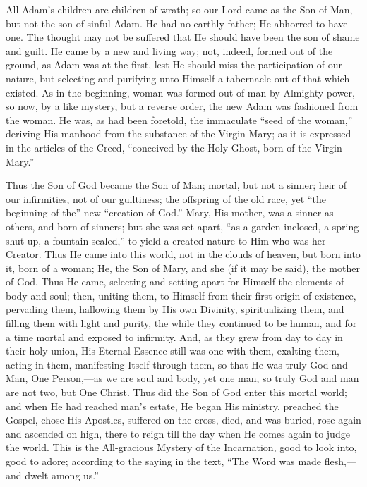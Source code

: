 All Adam's children are children of wrath; so our Lord came as the
Son of Man, but not the son of sinful Adam. He had no earthly father;
He abhorred to have one. The thought may not be suffered that He
should have been the son of shame and guilt. He came by a new and
living way; not, indeed, formed out of the ground, as Adam was at the
first, lest He should miss the participation of our nature, but
selecting and purifying unto Himself a tabernacle out of that which
existed. As in the beginning, woman was formed out of man by Almighty
power, so now, by a like mystery, but a reverse order, the new Adam
was fashioned from the woman. He was, as had been foretold, the
immaculate ``seed of the woman,'' deriving His manhood from
the substance of the Virgin Mary; as it is expressed in the articles
of the Creed, ``conceived by the Holy Ghost, born of the Virgin
Mary.''

Thus the Son of God became the Son of Man; mortal, but not a
sinner; heir of our infirmities, not of our guiltiness; the offspring
of the old race, yet ``the beginning of the'' new
``creation of God.'' Mary, His mother, was a sinner as others,
and born of sinners; but she was set apart, ``as a garden inclosed,
a spring shut up, a fountain sealed,'' to yield a created nature
to Him who was her Creator. Thus He came into this world, not in the
clouds of heaven, but born into it, born of a woman; He, the Son of
Mary, and she (if it may be said), the mother of God. Thus He came,
selecting and setting apart for Himself the elements of body and soul;
then, uniting them, to Himself from their first origin of existence,
pervading them, hallowing them by His own Divinity, spiritualizing
them, and filling them with light and purity, the while they continued
to be human, and for a time mortal and exposed to infirmity. And, as
they grew from day to day in their holy union, His Eternal Essence
still was one with them, exalting them, acting in them, manifesting
Itself through them, so that He was truly God and Man, One Person,—as
we are soul and body, yet one man, so truly God and man are not two,
but One Christ. Thus did the Son of God enter this mortal world; and
when He had reached man's estate, He began His ministry, preached the
Gospel, chose His Apostles, suffered on the cross, died, and was
buried, rose again and ascended on high, there to reign till the day
when He comes again to judge the world. This is the All-gracious
Mystery of the Incarnation, good to look into, good to adore;
according to the saying in the text, ``The Word was made flesh,—and
dwelt among us.''

